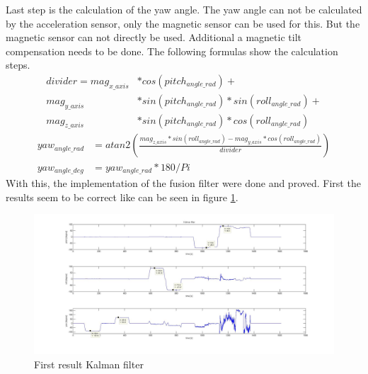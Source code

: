 Last step is the calculation of the yaw angle. The yaw angle can not be calculated by the acceleration sensor, only the magnetic sensor can be used for this. But the magnetic sensor can not directly be used. Additional a magnetic tilt compensation needs to be done. The following formulas show the calculation steps.\\
\begin{align}
divider=mag_{x\_axis}&*cos(pitch_{angle\_rad})+\\
mag_{y\_axis}&*sin(pitch_{angle\_rad})*sin(roll_{angle\_rad})+\\
mag_{z\_axis}&*sin(pitch_{angle\_rad})*cos(roll_{angle\_rad})
\end{align}
\begin{align}		
yaw_{angle\_rad}&=atan2\left(\frac{mag_{z\_axis}*sin(roll_{angle\_rad})-mag_{y\_axis}*cos(roll_{angle\_rad})}{divider}\right)\\
yaw_{angle\_deg}&=yaw_{angle\_rad}*180/Pi
\end{align}
With this, the implementation of the fusion filter were done and proved. First the results seem to be correct like can be seen in figure \ref{fig:initial_angle}.

\begin{figure}[H]
	\centering\includegraphics[width=1.0\textwidth]{fig/Res_Kal_Comp/initial_Kalman}
	\caption{First result Kalman filter}
	\label{fig:initial_angle}
\end{figure}
